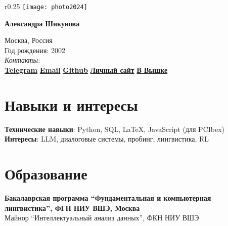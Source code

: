 \documentclass[11pt]{article} %
\begin{document}

\begin{wrapfigure}{r}{0.25\textwidth} %
    \centering
    \texttt{[image: photo2024]}
\end{wrapfigure}
{\LARGE\bfseries Александра Шикунова} %
\bigskip\bigskip\medskip %

Москва, Россия\\
Год рождения: 2002\\

\textit{Контакты:}\\
\textbf{\href{https://t.me/thnlgrlivrlvdwsbrnwthrssnhrys}{Telegram}} \hspace*{2em}
\textbf{\href{mailto:notalexandrashikunova@gmail.com}{Email}} \hspace*{2em}
\textbf{\href{https://github.com/poisongrapevine}{Github}} \hspace*{2em}
\textbf{\href{https://thddbptnsndshs.github.io/academic_site/}{Личный сайт}} \hspace*{2em}
\textbf{\href{https://www.hse.ru/org/persons/401664223}{В Вышке}}
\medskip %


\section*{Навыки и интересы}

\textbf{Технические навыки}: Python, SQL, LaTeX, JavaScript (для PCIbex)\\
\textbf{Интересы}: LLM, диалоговые системы, пробинг, лингвистика, RL


\section*{Образование}

\textbf{Бакалаврская программа ``Фундаментальная и компьютерная лингвистика'', ФГН НИУ ВШЭ, Москва}\\
 Майнор ``Интеллектуальный анализ данных'', ФКН НИУ ВШЭ
\end{document}
